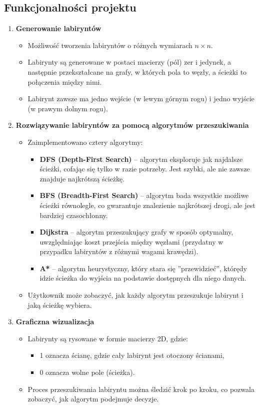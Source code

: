 \documentclass{article}
\begin{document}
\subsection{Funkcjonalności projektu}
\begin{enumerate}
    \item \textbf{Generowanie labiryntów}
    \begin{itemize}
        \item Możliwość tworzenia labiryntów o różnych wymiarach \(n \times n\).
        \item Labirynty są generowane w postaci macierzy (pól) zer i jedynek, a następnie przekształcane na grafy, w których pola to węzły, a ścieżki to połączenia między nimi.
        \item Labirynt zawsze ma jedno wejście (w lewym górnym rogu) i jedno wyjście (w prawym dolnym rogu).
    \end{itemize}
    
    \item \textbf{Rozwiązywanie labiryntów za pomocą algorytmów przeszukiwania}
    \begin{itemize}
        \item Zaimplementowano cztery algorytmy:
        \begin{itemize}
            \item \textbf{DFS (Depth-First Search)} – algorytm eksploruje jak najdalsze ścieżki, cofając się tylko w razie potrzeby. Jest szybki, ale nie zawsze znajduje najkrótszą ścieżkę.
            \item \textbf{BFS (Breadth-First Search)} – algorytm bada wszystkie możliwe ścieżki równolegle, co gwarantuje znalezienie najkrótszej drogi, ale jest bardziej czasochłonny.
            \item \textbf{Dijkstra} – algorytm przeszukujący grafy w sposób optymalny, uwzględniając koszt przejścia między węzłami (przydatny w przypadku labiryntów z różnymi wagami krawędzi).
            \item \textbf{A*} – algorytm heurystyczny, który stara się ''przewidzieć'', którędy idzie ścieżka do wyjścia na podstawie dostępnych dla niego danych.
        \end{itemize}
        \item Użytkownik może zobaczyć, jak każdy algorytm przeszukuje labirynt i jaką ścieżkę wybiera.
    \end{itemize}
    
    \item \textbf{Graficzna wizualizacja}
    \begin{itemize}
        \item Labirynty są rysowane w formie macierzy 2D, gdzie:
        \begin{itemize}
            \item 1 oznacza ścianę, gdzie cały labirynt jest otoczony ścianami,
            \item 0 oznacza wolne pole (ścieżka).
        \end{itemize}
        \item Proces przeszukiwania labiryntu można śledzić krok po kroku, co pozwala zobaczyć, jak algorytm podejmuje decyzje.
    \end{itemize}
    

\end{enumerate}
\end{document}
